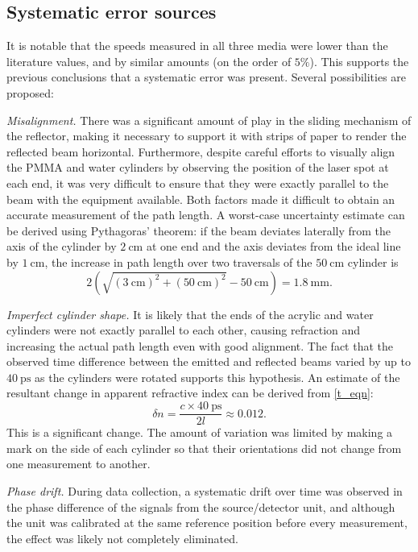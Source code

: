 \documentclass[
    aps,
    prl,
    reprint,
    10pt,
    amsmath,
    amssymb,
    a4paper,
    longbibliography
]{revtex4-2}
\begin{document}
\subsection{Systematic error sources}

It is notable that the speeds measured in all three media were lower
than the literature values, and by similar amounts (on the order of
$5\%$). This supports the previous conclusions that a systematic error
was present.
Several possibilities are proposed:

\emph{Misalignment.} There was a significant amount of play in the
sliding mechanism of the reflector, making it necessary to support it
with strips of paper to render the reflected beam horizontal. Furthermore,
despite careful efforts to visually align the PMMA and water cylinders
by observing the position of the laser spot at each end, it was very
difficult to ensure that they
were exactly parallel to the beam with the equipment available. Both
factors made it difficult to obtain an accurate measurement of the path
length. A worst-case uncertainty estimate can be derived using Pythagoras'
theorem: if the beam deviates laterally from the axis of the cylinder by
$\SI{2}{\centi\meter}$ at one end and the axis deviates from the ideal
line by $\SI{1}{\centi\meter}$, the increase in path length over
two traversals of the $\SI{50}{\centi\meter}$ cylinder is
\[
    2\left(
        \sqrt{(\SI{3}{\centi\meter})^2 + (\SI{50}{\centi\meter})^2}
        - \SI{50}{\centi\meter}
    \right)
    = \SI{1.8}{\milli\meter}.
\]

\emph{Imperfect cylinder shape.} It is likely that the ends of the
acrylic and water cylinders were not exactly parallel to each other,
causing refraction and increasing the actual path length even with
good alignment. The fact that the observed time difference between
the emitted and reflected beams varied by up to $\SI{40}{\pico\second}$
as the cylinders were rotated supports this hypothesis.
An estimate of the resultant change in apparent refractive index can
be derived from \ref{t_eqn}:
\[
    \delta n = \frac{c \times \SI{40}{\pico\second}}{2l} \approx 0.012.
\]
This is a significant change. The amount of variation was limited by
making a mark on the side of each cylinder so that their orientations
did not change from one measurement to another.

\emph{Phase drift.} During data collection, a systematic drift over time
was observed in the phase difference of the signals from the
source/detector unit, and although the unit was calibrated at the
same reference position before every measurement, the effect was likely
not completely eliminated.
\end{document}
